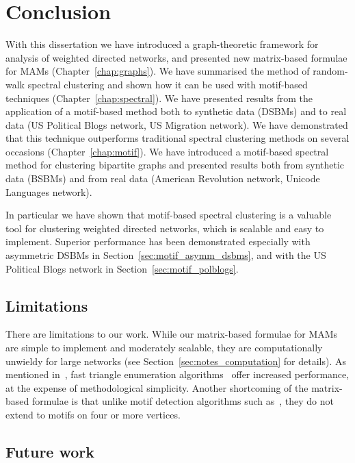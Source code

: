 \documentclass[12pt,draft]{ociamthesis}
\theoremstyle{plain}
\theoremstyle{definition}
\theoremstyle{remark}
\begin{document}
\clearpage{}
\clearpage{}
\chapter{Conclusion} \label{chap:conclusions}

With this dissertation we have introduced a graph-theoretic framework for
analysis of weighted directed networks, and presented new matrix-based formulae
for MAMs (Chapter~\ref{chap:graphs}).
We have summarised the method of random-walk spectral clustering and shown how
it can be used with motif-based techniques (Chapter~\ref{chap:spectral}).
We have presented results from the application of a motif-based method both to
synthetic data (DSBMs) and to real data (US Political Blogs network, US
Migration network). We have demonstrated that this technique outperforms
traditional spectral clustering methods on several occasions
(Chapter~\ref{chap:motif}).
We have introduced a motif-based spectral method for clustering bipartite
graphs and presented results both from synthetic data (BSBMs) and from real
data (American Revolution network, Unicode Languages network).

In particular we have shown that motif-based spectral clustering is a valuable
tool for clustering weighted directed networks, which is scalable and easy to
implement.
Superior performance has been demonstrated especially with asymmetric DSBMs in
Section~\ref{sec:motif_asymm_dsbms}, and with the US Political Blogs network in
Section~\ref{sec:motif_polblogs}.

\section*{Limitations}

There are limitations to our work.
While our matrix-based formulae for MAMs are simple to implement and moderately
scalable, they are computationally unwieldy for large networks (see
Section~\ref{sec:notes_computation} for details).
As mentioned in~\cite{benson2016higher}, fast triangle enumeration
algorithms~\cite{demeyer2013ISMA,wernicke2006efficient,wernicke2006fanmod}
offer increased performance, at the expense of methodological simplicity.
Another shortcoming of the matrix-based formulae is that unlike motif detection
algorithms such as~\cite{wernicke2006fanmod}, they do not extend to motifs on
four or more vertices.

\section*{Future work}
\end{document}
